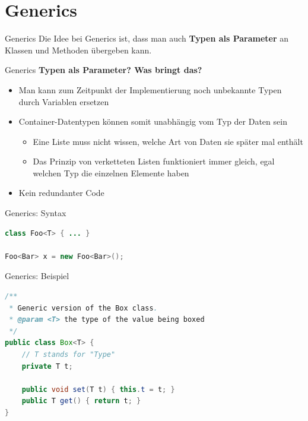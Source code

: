 \documentclass[18pt]{beamer}
\begin{document}
\section{Generics}

\begin{frame}{Generics}
    Die Idee bei Generics ist, dass man auch \textbf{Typen als Parameter} an Klassen und Methoden übergeben kann.
\end{frame}

\begin{frame}{Generics}
    \textbf{Typen als Parameter? Was bringt das?}
    \begin{itemize}
        \item Man kann zum Zeitpunkt der Implementierung noch unbekannte Typen durch Variablen ersetzen
        \item Container-Datentypen können somit unabhängig vom Typ der Daten sein
        \begin{itemize}
            \item Eine Liste muss nicht wissen, welche Art von Daten sie später mal enthält
            \item Das Prinzip von verketteten Listen funktioniert immer gleich, egal welchen Typ die einzelnen Elemente haben
        \end{itemize}
        \item Kein redundanter Code
    \end{itemize}

\end{frame}

\begin{frame}[fragile]{Generics: Syntax}

    \begin{exampleblock}{}
        \begin{lstlisting}[language=Java]
class Foo<T> { ... }

Foo<Bar> x = new Foo<Bar>();
        \end{lstlisting}

    \end{exampleblock}

\end{frame}

\begin{frame}[fragile]{Generics: Beispiel}
    \begin{lstlisting}[language=Java]
/**
 * Generic version of the Box class.
 * @param <T> the type of the value being boxed
 */
public class Box<T> {
    // T stands for "Type"
    private T t;

    public void set(T t) { this.t = t; }
    public T get() { return t; }
}
    \end{lstlisting}

\end{frame}
\end{document}
